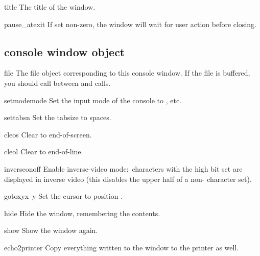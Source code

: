 \begin{datadesc}{title}
The title of the window.
\end{datadesc}

\begin{datadesc}{pause_atexit}
If set non-zero, the window will wait for user action before closing.
\end{datadesc}

\subsection{console window object}


\begin{datadesc}{file}
The file object corresponding to this console window. If the file is
buffered, you should call  between 
and  calls.
\end{datadesc}


\begin{funcdesc}{setmode}{mode}
Set the input mode of the console to , etc.
\end{funcdesc}

\begin{funcdesc}{settabs}{n}
Set the tabsize to  spaces.
\end{funcdesc}

\begin{funcdesc}{cleos}{}
Clear to end-of-screen.
\end{funcdesc}

\begin{funcdesc}{cleol}{}
Clear to end-of-line.
\end{funcdesc}

\begin{funcdesc}{inverse}{onoff}
Enable inverse-video mode:\ characters with the high bit set are
displayed in inverse video (this disables the upper half of a
non-\ASCII{} character set).
\end{funcdesc}

\begin{funcdesc}{gotoxy}{x\, y}
Set the cursor to position .
\end{funcdesc}

\begin{funcdesc}{hide}{}
Hide the window, remembering the contents.
\end{funcdesc}

\begin{funcdesc}{show}{}
Show the window again.
\end{funcdesc}

\begin{funcdesc}{echo2printer}{}
Copy everything written to the window to the printer as well.
\end{funcdesc}
